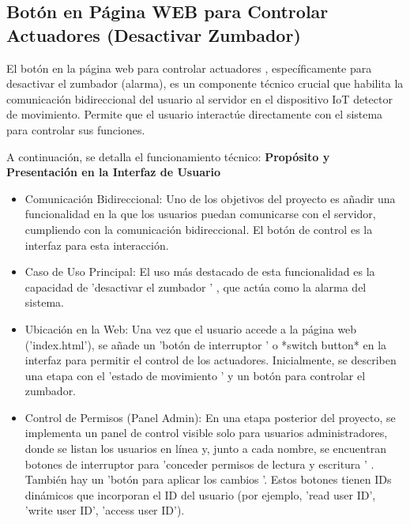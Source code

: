 \documentclass{report}
\begin{document}
\subsection{Botón en Página WEB para Controlar Actuadores (Desactivar Zumbador)}
El  botón en la página web para controlar actuadores , específicamente para  desactivar el zumbador  (alarma), es un componente técnico crucial que 
habilita la  comunicación bidireccional del usuario al servidor  en el dispositivo IoT detector de movimiento. Permite que el usuario interactúe directamente 
con el sistema para controlar sus funciones.

A continuación, se detalla el funcionamiento técnico:
\textbf{Propósito y Presentación en la Interfaz de Usuario}
\begin{itemize}
    \item Comunicación Bidireccional:  Uno de los objetivos del proyecto es añadir una funcionalidad en la que los usuarios puedan comunicarse con el 
    servidor, cumpliendo con la comunicación bidireccional. El botón de control es la interfaz para esta interacción.
    \item Caso de Uso Principal:  El uso más destacado de esta funcionalidad es la capacidad de   'desactivar el zumbador ' , que actúa como la alarma 
    del sistema.
    \item Ubicación en la Web:  Una vez que el usuario accede a la página web ('index.html'), se añade un  'botón de interruptor ' o *switch button* 
    en la interfaz para permitir el control de los actuadores. Inicialmente, se  describen una etapa con el  'estado de movimiento ' y un botón 
    para controlar el zumbador.
    \item Control de Permisos (Panel Admin):  En una etapa posterior del proyecto, se implementa un panel de control visible solo para usuarios 
    administradores, donde se listan los usuarios en línea y, junto a cada nombre, se encuentran botones de interruptor para   'conceder permisos de 
    lectura y escritura ' . También hay un  'botón para aplicar los cambios '. Estos botones tienen IDs dinámicos que incorporan el ID del usuario 
    (por ejemplo, 'read user ID', 'write user ID', 'access user ID').
\end{itemize}
\end{document}

